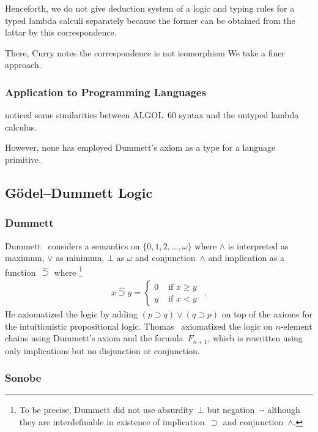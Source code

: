  Henceforth, we do not give deduction system of a logic and
 typing rules for a typed lambda calculi separately because
 the former can be obtained from the lattar by this correspondence.

There, Curry notes the correspondence is not isomorphism  We take a finer approach.

\subsubsection{Application to Programming Languages}

\citet{landin1965} noticed some similarities between ALGOL~60 syntax and
the untyped lambda calculus.

However, none has employed Dummett's axiom as a type for a language primitive.

\subsection{G\"odel--Dummett Logic}
\subsubsection{Dummett}
Dummett~\cite{dummett59} considers a semantics on $\{0,1,2,\ldots,\omega\}$ where
$\wedge$ is interpreted as maximum, $\vee$ as minimum, $\bot$ as $\omega$
and conjunction~$\wedge$
 and implication as a
function~$\hat\supset$ where%
\footnote{To be precise, Dummett did not use absurdity~$\bot$ but negation~$\neg$
although they are interdefinable in existence of implication~$\supset$
and conjunction~$\wedge$.}
\begin{align*}
 x \hat\supset y= \begin{cases}
		    0 &\text{ if } x\ge y \\
		    y &\text{ if } x < y
		  \end{cases}\enspace.
\end{align*}
He axiomatized the logic by adding $(p\supset q)\lor(q\supset p)$ on top
of the axioms for the intuitionistic propositional logic.
Thomas~\citep{thomas1962} axiomatized
 the logic on $n$-element chains using Dummett's axiom and the
 formula~$F_{n+1}$,
 which is rewritten using only implications but no disjunction or conjunction.

\subsubsection{Sonobe}

